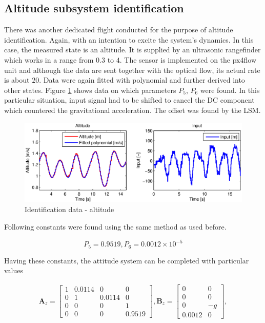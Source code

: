 \subsection{Altitude subsystem identification}

There was another dedicated flight conducted for the purpose of altitude identification. Again, with an intention to excite the system's dynamics. In this case, the measured state is an altitude. It is supplied by an ultrasonic rangefinder which works in a range from $0.3$ to $4$. The sensor is implemented on the px4flow unit and although the data are sent together with the optical flow, its actual rate is about $20$. Data were again fitted with polynomial and further derived into other states. Figure \ref{fig:iden3} shows data on which parameters $P_5$, $P_6$ were found. In this particular situation, input signal had to be shifted to cancel the DC component which countered the gravitational acceleration. The offset was found by the LSM.

\begin{figure}[h]
\includegraphics[width=1\textwidth]{fig/iden3.eps} 
\caption{Identification data - altitude}
\label{fig:iden3}
\end{figure}

Following constants were found using the same method as used before. 

\begin{equation}
P_5 = 0.9519, P_6 = 0.0012 \times 10^{-5} 
\label{eq:constants1}
\end{equation}

Having these constants, the attitude system can be completed with particular values

\begin{equation}
\begin{split}
\mathbf{A}_{z} = \begin{bmatrix}
1 & 0.0114 & 0 & 0\\
0 & 1 & 0.0114 & 0\\
0 & 0 & 0 & 1 \\
0 & 0 & 0 & 0.9519
\end{bmatrix}, \mathbf{B}_{z} = \begin{bmatrix}
0 & 0\\
0 & 0\\
0 & -g\\
0.0012 & 0
\end{bmatrix},
\end{split}
\label{eq:altitude_LTI}
\end{equation}

